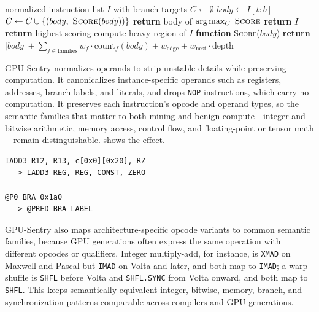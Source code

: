 \begin{algorithm}[t]
    \caption{Main computational loop extraction for one kernel.}
    \label{alg:mainloop}
    \begin{algorithmic}[1]
        \REQUIRE normalized instruction list $I$ with branch targets
        \STATE $C \gets \emptyset$ 
            \STATE $body \gets I[t \mathbin{:} b]$ 
            \STATE $C \gets C \cup \{(body,\ \textsc{Score}(body))\}$
        \ENDFOR
            \STATE \textbf{return} body of $\arg\max_{C}\ \textsc{Score}$
            \STATE \textbf{return} $I$ 
        \ELSE
            \STATE \textbf{return} highest-scoring compute-heavy region of $I$
        \ENDIF
        \STATE
        \STATE \textbf{function} \textsc{Score}($body$) 
        \STATE \quad \textbf{return} $|body| + \!\!\sum\limits_{f \in \text{families}}\!\! w_f \cdot \mathrm{count}_f(body) + w_{\text{edge}} + w_{\text{nest}}\!\cdot\!\text{depth}$
    \end{algorithmic}
\end{algorithm}

GPU-Sentry normalizes operands to strip unstable details while preserving computation. It canonicalizes instance-specific operands such as registers, addresses, branch labels, and literals, and drops \texttt{NOP} instructions, which carry no computation. It preserves each instruction's opcode and operand types, so the semantic families that matter to both mining and benign compute---integer and bitwise arithmetic, memory access, control flow, and floating-point or tensor math---remain distinguishable.  shows the effect.

\begin{lstlisting}[caption={SASS normalization preserves opcode and operand-type semantics while removing instance-specific detail.},label={lst:normalization}]
IADD3 R12, R13, c[0x0][0x20], RZ
  -> IADD3 REG, REG, CONST, ZERO

@P0 BRA 0x1a0
  -> @PRED BRA LABEL
\end{lstlisting}

GPU-Sentry also maps architecture-specific opcode variants to common semantic families, because GPU generations often express the same operation with different opcodes or qualifiers. Integer multiply-add, for instance, is \texttt{XMAD} on Maxwell and Pascal but \texttt{IMAD} on Volta and later, and both map to \texttt{IMAD}; a warp shuffle is \texttt{SHFL} before Volta and \texttt{SHFL.SYNC} from Volta onward, and both map to \texttt{SHFL}. This keeps semantically equivalent integer, bitwise, memory, branch, and synchronization patterns comparable across compilers and GPU generations.

